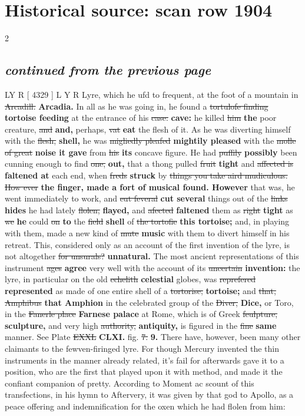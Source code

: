 \documentclass[10pt]{article}
\begin{document}
\section*{Historical source: scan row 1904}
\begin{multicols}{2}
\subsection*{\textit{continued from the previous page}}
LY R [ 4329 ] L Y R Lyre, which he ufd to frequent, at the foot of a mountain in \sout{Arcadill.} \textbf{Arcadia.} In all as he was going in, he found a \sout{tortulofe finding} \textbf{tortoise feeding} at the entrance of his \sout{case:} \textbf{cave:} he killed \sout{him} \textbf{the} poor creature, \sout{and} \textbf{and,} perhaps, \sout{vat} \textbf{eat} the flesh of it. As he was diverting himself with the \sout{flesh,} \textbf{shell,} he was \sout{migliedly pleafed} \textbf{mightily pleased} with the \sout{molle of great} \textbf{noise it gave} from \sout{his} \textbf{its} concave figure. He had \sout{puffily} \textbf{possibly} been cunning enough to find \sout{one,} \textbf{out,} that a thong pulled \sout{fruit} \textbf{tight} and \sout{affected is} \textbf{faltened at} each end, when \sout{freds} \textbf{struck} by \sout{things you take aird mudiculous. How ever} \textbf{the finger, made a fort of musical found. However} that was, he went immediately to work, and \sout{eut feveral} \textbf{cut several} things out of the \sout{links} \textbf{hides} he had lately \sout{flolen,} \textbf{flayed,} and \sout{afected} \textbf{faltened} them as \sout{right} \textbf{tight} as \sout{we} \textbf{he} could \sout{on} \textbf{to} the \sout{field} \textbf{shell} of \sout{the tortofie} \textbf{this tortoise;} and, in playing with them, made a new kind of \sout{mute} \textbf{music} with them to divert himself in his retreat. This, considered only as an account of the first invention of the lyre, is not altogether \sout{for unsurals?} \textbf{unnatural.} The most ancient representations of this instrument \sout{ages} \textbf{agree} very well with the account of its \sout{uncertain} \textbf{invention:} the lyre, in particular on the old \sout{echelith} \textbf{celestial} globes, was \sout{reprefered} \textbf{represented} as made of one entire shell of a \sout{tortorise;} \textbf{tortoise;} and \sout{that, Amphibus} \textbf{that Amphion} in the celebrated group of the \sout{Diver,} \textbf{Dice,} or Toro, in the \sout{Fanerle place} \textbf{Farnese palace} at Rome, which is of Greek \sout{feulpture,} \textbf{sculpture,} and very high \sout{authority,} \textbf{antiquity,} is figured in the \sout{fine} \textbf{same} manner. See Plate \sout{EXXL} \textbf{CLXI.} fig. \sout{7.} \textbf{9.} There have, however, been many other claimants to the fewven-firinged lyre. For though Mercury invented the thin instruments in the manner already related, it's fail for afterwards gave it to a position, who are the first that played upon it with method, and made it the confiant companion of pretty. According to Moment ac scount of this transfections, in his hymn to Aftervery, it was given by that god to Apollo, as a peace offering and indemnification for the oxen which he had flolen from him: 
\end{multicols}
\end{document}
